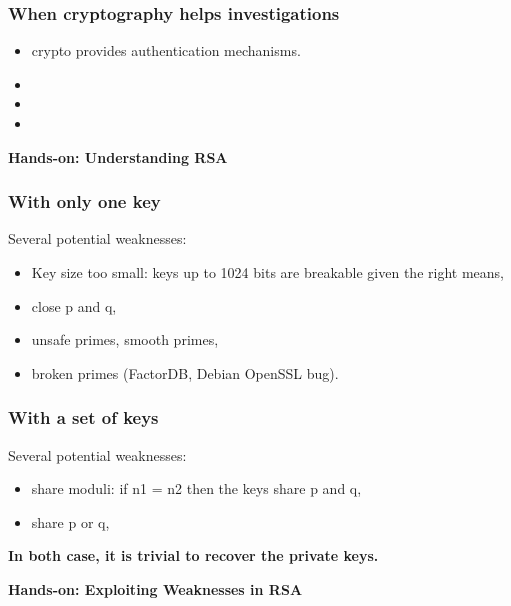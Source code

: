 \documentclass{beamer}
\begin{document}
\begin{frame}
        \frametitle{When cryptography helps investigations}
        \begin{itemize}
          \item crypto provides authentication mechanisms.
          \item
          \item
          \item
        \end{itemize}

\end{frame}

\begin{frame}
  \begin{center}
    {\bf Hands-on: Understanding RSA}
  \end{center}
\end{frame}

\begin{frame}
  \frametitle{With only one key}
  Several potential weaknesses:
  \begin{itemize}
    \item Key size too small: keys up to 1024 bits are breakable given the
      right means,
    \item close p and q,
    \item unsafe primes, smooth primes,
    \item broken primes (FactorDB, Debian OpenSSL bug).
  \end{itemize}

\end{frame}

\begin{frame}
  \frametitle{With a set of  keys}
  Several potential weaknesses:
  \begin{itemize}
   \item share moduli: if n1 = n2 then the keys share p and q,
   \item share p or q,
  \end{itemize}
 \vspace{10mm}
  {\bf In both case, it is trivial to recover the private keys.}

\end{frame}

\begin{frame}
  \begin{center}
    {\bf Hands-on: Exploiting Weaknesses in RSA}
  \end{center}
\end{frame}
\end{document}
